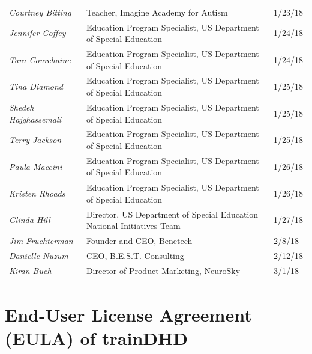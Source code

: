 \documentclass[letterpaper,10pt]{article}
\let\oldsection\section
\renewcommand{\section}{\def\cursectioning{section}\oldsection}
\begin{document}
\begin{appendices}
\begin{table}[]
\begin{tabular}{lll}
\textit{Courtney Bitting}                & Teacher, Imagine Academy for Autism                                    & 1/23/18                           \\
\textit{Jennifer Coffey}                 & Education Program Specialist, US Department of Special Education       & 1/24/18                           \\
\textit{Tara Courchaine}                 & Education Program Specialist, US Department of Special Education       & 1/24/18                           \\
\textit{Tina Diamond}                    & Education Program Specialist, US Department of Special Education       & 1/25/18                           \\
\textit{Shedeh Hajghassemali}            & Education Program Specialist, US Department of Special Education       & 1/25/18                           \\
\textit{Terry Jackson}                   & Education Program Specialist, US Department of Special Education       & 1/25/18                           \\
\textit{Paula Maccini}                   & Education Program Specialist, US Department of Special Education       & 1/26/18                           \\
\textit{Kristen Rhoads}                  & Education Program Specialist, US Department of Special Education       & 1/26/18                           \\
\textit{Glinda Hill}                     & Director, US Department of Special Education National Initiatives Team & 1/27/18                           \\
\textit{Jim Fruchterman}                 & Founder and CEO, Benetech                                              & 2/8/18                            \\
\textit{Danielle Nuzum}                  & CEO, B.E.S.T. Consulting                                               & 2/12/18                           \\
\textit{Kiran Buch}                      & Director of Product Marketing, NeuroSky                                  & 3/1/18    
\end{tabular}
\end{table}





\section{End-User License Agreement (EULA) of trainDHD}
\label{appendix:eula}



\end{appendices}
\end{document}
